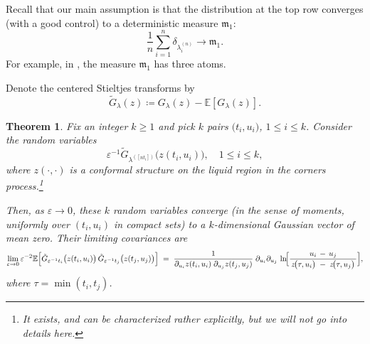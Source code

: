 \documentclass[letterpaper,11pt,oneside,reqno]{book}
\numberwithin{equation}{chapter}  %
\newtheorem{theorem}[proposition]{Theorem}
\theoremstyle{definition}
\begin{document}
Recall that our main assumption is that the distribution at the top row converges
(with a good control) to a deterministic measure $\mathfrak{m}_1$:
\begin{equation*}
	\frac{1}{n}\sum_{i=1}^n \delta_{\lambda^{(n)}_i} \to \mathfrak{m}_1.
\end{equation*}
For example, in , the measure $\mathfrak{m}_1$ has
three atoms.

Denote the centered Stieltjes transforms by
\begin{equation*}
	\tilde G_{\lambda}(z)\coloneqq G_\lambda(z)-\mathbb{E}[G_\lambda(z)].
\end{equation*}

\begin{theorem}
Fix an integer \(k \ge 1\) and pick \(k\) pairs \(\bigl(t_i,u_i\bigr)\), \(1 \le i \le k\).
Consider the random variables
\[
	\varepsilon^{-1}\tilde G_{\lambda^{([n t_i])}}\bigl(z(t_i,u_i)\bigr),
\quad 1\le i\le k,
\]
where \(z(\cdot,\cdot)\) is
a conformal structure on the liquid region in the corners process.\footnote{It
exists, and can be characterized rather explicitly, but we will not go into
details here.}

Then, as \(\varepsilon \to 0\), these \(k\) random variables converge (in the sense of moments, uniformly over \((t_i,u_i)\) in compact sets) to a \(k\)-dimensional Gaussian vector of mean zero.  Their limiting covariances are
\[
\lim_{\varepsilon \to 0}
\varepsilon^{-2}\mathbb{E}\Bigl[
\tilde G_{\varepsilon^{-1}t_i}\bigl(z(t_i,u_i)\bigr)\,
\tilde G_{\varepsilon^{-1}t_j}\bigl(z(t_j,u_j)\bigr)
\Bigr]
\;=\;
\frac{1}{
\partial_{u_i}z(t_i,u_i)
\;\partial_{u_j}z(t_j,u_j)
}
\;\partial_{u_i}\partial_{u_j}\,
\ln \!\Bigl[
\frac{u_i \,-\,u_j}{
\,z\!\bigl(\tau,u_i\bigr) \;-\; z\!\bigl(\tau,u_j\bigr)\,}
\Bigr],
\]
where \(\tau = \min(t_i,t_j)\).
\end{theorem}
\end{document}
